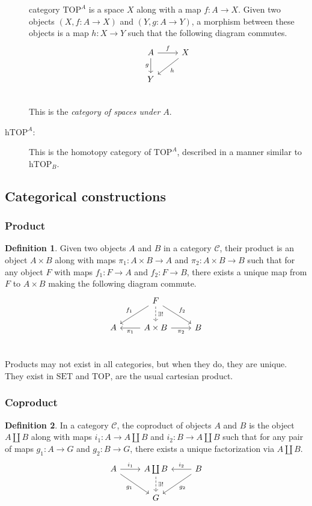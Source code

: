 \documentclass[12pt, notitlepage]{article}
\theoremstyle{definition}
\newtheorem{defn}{Definition}[section]
\newcommand{\cat}[1]{\mathrm{#1}}
\begin{document}
\begin{description}
    category $\cat{TOP}^A$ is a space $X$ along with a map $f: A \to X$. Given
    two objects $(X, f: A \to X)$ and $(Y, g: A \to Y)$, a morphism between these
    objects is a map $h: X \to Y$ such that the following diagram commutes.
    \[
    \begin{tikzcd}
    A \arrow{r}{f} \arrow[swap]{d}{g} & X \ar{dl}{h}  \\
    Y & \\
    \end{tikzcd}
    \]
    This is the \emph{category of spaces under $A$}.
  \item[$\cat{hTOP}^A$:] This is the homotopy category of $\cat{TOP}^A$,
    described in a manner similar to $\cat{hTOP}_B$.
\end{description}

\subsection{Categorical constructions}
\subsubsection{Product}

\begin{defn}
  Given two objects $A$ and $B$ in a category $\mathcal{C}$, their
  product is an object $A \times B$ along with maps
  $\pi_1 : A \times B \to A$ and $\pi_2 : A \times B \to B$ such that
  for any object $F$ with maps $f_1 : F \to A$ and $f_2: F \to B$,
  there exists a unique map from $F$ to $A \times B$ making the
  following diagram commute.
\[
\begin{tikzcd}
&      F \arrow[swap]{dl}{f_1} \arrow{dr}{f_2} \arrow[dashed]{d}{\exists !}     & \\
A & A \times B \arrow{l}{\pi_1} \arrow[swap]{r}{\pi_2}  & B \\
\end{tikzcd}
\]    
\end{defn}

Products may not exist in all categories, but when they do, they are
unique.  They exist in $\cat{SET}$ and $\cat{TOP}$, are the usual
cartesian product.

\subsubsection{Coproduct}

\begin{defn}
  In a category $\mathcal{C}$, the coproduct of objects $A$ and $B$ is
  the object $A \coprod B$ along with maps $i_1: A \to A \coprod B$
  and $i_2: B \to A \coprod B$ such that for any pair of maps
  $g_1 : A \to G$ and $g_2: B \to G$, there exists a unique
  factorization via $A \coprod B$.
    \[
    \begin{tikzcd}
    A \ar{r}{i_1} \ar[swap]{dr}{g_1} & A \coprod B \ar[dashed]{d}{\exists !} & B \ar[swap]{l}{i_2} \ar{dl}{g_2} \\
    & G & \\
    \end{tikzcd}
    \]
\end{defn}
\end{document}
